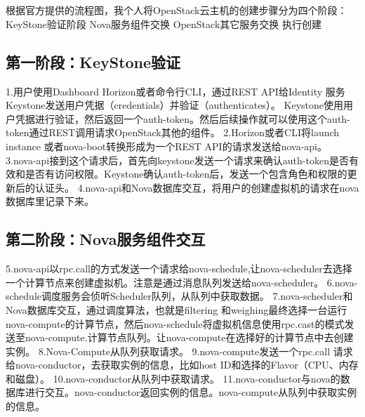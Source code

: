 \documentclass[a4paper,left=1.5cm,right=1.5cm,11pt]{article}
\begin{document}
\tableofcontents

\clearpage

\section{}
根据官方提供的流程图，我个人将OpenStack云主机的创建步骤分为四个阶段：
KeyStone验证阶段
Nova服务组件交换
OpenStack其它服务交换
执行创建
\subsection{第一阶段：KeyStone验证}
1.用户使用Dashboard Horizon或者命令行CLI，通过REST API给Identity 服务Keystone发送用户凭据（credentials）并验证（authenticates）。
Keystone使用用户凭据进行验证，然后返回一个auth-token。然后后续操作就可以使用这个auth-token通过REST调用请求OpenStack其他的组件。
2.Horizon或者CLI将launch instance 或者nova-boot转换形成为一个REST API的请求发送给nova-api。
3.nova-api接到这个请求后，首先向keystone发送一个请求来确认auth-token是否有效和是否有访问权限。Keystone确认auth-token后，发送一个包含角色和权限的更新后的认证头。
4.nova-api和Nova数据库交互，将用户的创建虚拟机的请求在nova 数据库里记录下来。

\subsection{第二阶段：Nova服务组件交互}
5.nova-api以rpc.call的方式发送一个请求给nova-schedule,让nova-scheduler去选择一个计算节点来创建虚拟机。注意是通过消息队列发送给nova-scheduler。
6.nova-schedule调度服务会侦听Scheduler队列，从队列中获取数据。
7.nova-scheduler和Nova数据库交互，通过调度算法，也就是filtering 和weighing最终选择一台运行nova-compute的计算节点，然后nova-schedule将虚拟机信息使用rpc.cast的模式发送至nova-compute.计算节点队列。让nova-compute在选择好的计算节点中去创建实例。
8.Nova-Compute从队列获取请求。
9.nova-compute发送一个rpc.call 请求给nova-conductor，去获取实例的信息，比如host ID和选择的Flavor（CPU、内存和磁盘）。
10.nova-conductor从队列中获取请求。
11.nova-conductor与nova的数据库进行交互。nova-conductor返回实例的信息。nova-compute从队列中获取实例的信息。
\end{document}
